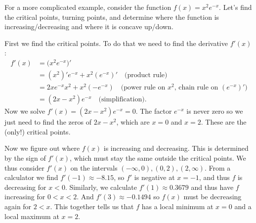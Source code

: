 \begin{bsp}

For a more complicated example, consider the function $f(x) = x^2e^{-x}$.
Let's find the critical points, turning points, and determine where the function is increasing/decreasing and where it is concave up/down.

First we find the critical points. To do that we need to find the derivative $f'(x)$:
\begin{equation*}
\begin{split}
f'(x) &= \big(x^2e^{-x}\big)' \\
&= (x^2)'e^{-x} + x^2(e^{-x})' \quad \text{(product rule)} \\
&= 2xe^{-x}x^2 + x^2(-e^{-x}) \quad \text{(power rule on }x^2 \text{, chain rule on }(e^{-x})' \text{)} \\
&= (2x-x^2)e^{-x} \quad \text{(simplification)}.
\end{split}
\end{equation*}
Now we solve $f'(x) = (2x-x^2)e^{-x} = 0$. The factor $e^{-x}$ is never zero
so we just need to find the zeros of $2x-x^2$, which are $x=0$ and $x=2$.
These are the (only!) critical points.

Now we figure out where $f(x)$ is increasing and decreasing. This is
determined by the sign of $f'(x)$, which must stay the same outside the
critical points. We thus consider $f'(x)$  on the intervals $(-\infty,0), (0,2), (2,\infty)$.
From
a calculator we find $f'(-1) \approx -8.15$, so $f'$ is negative at $x=-1$,
and thus $f$ is decreasing for $x<0$.
Similarly, we calculate $f'(1) \approx 0.3679$ and thus have $f$ increasing
for $0<x<2$. And
$f'(3) \approx -0.1494$ so $f(x)$
must be decreasing again for $2<x$. This together tells us that $f$ has a
local minimum at $x=0$ and a
local maximum at $x=2$.


\end{bsp}
